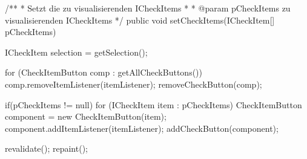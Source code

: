 \begin{spacing}{0.75}
\begin{javacode}[firstnumber=43]
/**
* Setzt die zu visualisierenden ICheckItems
*
* @param pCheckItems zu visualisierenden ICheckItems
*/
public void setCheckItems(ICheckItem[] pCheckItems)
{
  ICheckItem selection = getSelection();
  
  for (CheckItemButton comp : getAllCheckButtons())
  {
    comp.removeItemListener(itemListener);
    removeCheckButton(comp);
  }
  
  if(pCheckItems != null)
  {
    for (ICheckItem item : pCheckItems)
    {
      CheckItemButton component = new CheckItemButton(item);
      component.addItemListener(itemListener);
      addCheckButton(component);
    }
  }
  
  revalidate();
  repaint();
}

\end{javacode}
\end{spacing}